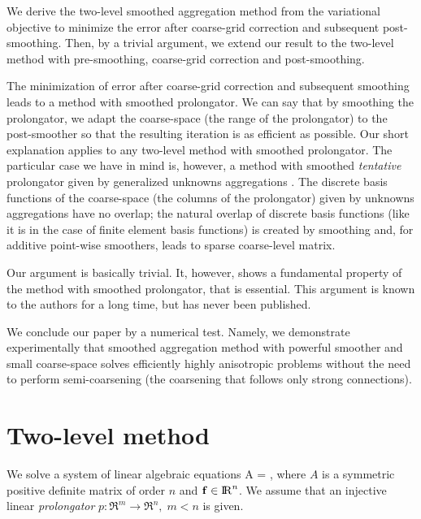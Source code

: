 We derive the two-level smoothed aggregation
method from the variational objective to minimize the
error after coarse-grid correction and subsequent post-smoothing.
Then, by a trivial argument, we extend our result
to the two-level method
with pre-smoothing, coarse-grid correction and post-smoothing.

The minimization of error after coarse-grid correction
and subsequent smoothing leads to a method with smoothed prolongator.
We can say that by smoothing the prolongator,
we adapt the coarse-space (the range of the
prolongator) to the post-smoother so that the resulting iteration is as
efficient as possible. Our short explanation applies to any two-level method
with smoothed prolongator. The particular case we have in mind is, however, a
method with smoothed {\em tentative} prolongator given by generalized
unknowns aggregations
\cite{amg-theory}. The discrete basis functions of the coarse-space
(the columns of the prolongator) given by
unknowns aggregations have no overlap; the natural
overlap of discrete
basis functions (like it is in the case of
finite element basis functions) is created by smoothing and, for
additive point-wise smoothers, leads to sparse
coarse-level
matrix.

Our argument is basically trivial. It, however, shows a fundamental
property of the method with smoothed prolongator, that is essential.
This argument is known to the authors for a long time,
but has never been published.

We conclude our paper by a numerical test. Namely, we demonstrate
experimentally that smoothed aggregation method with powerful smoother
and small coarse-space solves efficiently highly anisotropic problems
without the need to perform semi-coarsening (the coarsening that follows
only strong connections).


\section{Two-level method}
We solve a system of linear algebraic equations
       A = ,
\qe
where $A$ is a symmetric positive definite matrix of order $n$ and
${\bf f} \in {\rm I\negthinspace R}^n$. We assume that an injective linear {\em prolongator}
$p : \Re^m \rightarrow \Re^n,\; m < n$ is given.

